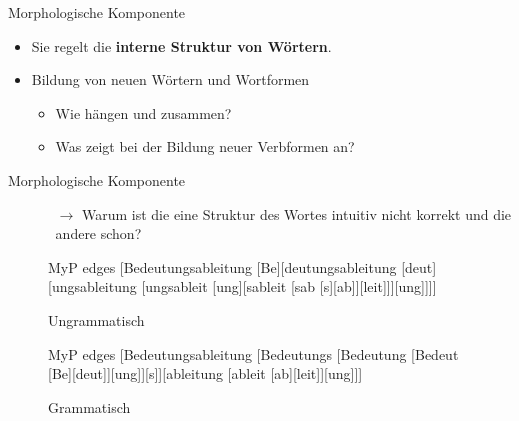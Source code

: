 \begin{frame}{Morphologische Komponente}

\begin{itemize}
	\item Sie regelt die \textbf{interne Struktur von Wörtern}.
	\item[]
	\item Bildung von neuen Wörtern und Wortformen
				
	\begin{itemize}
		\item[]
		\item<2->[$\rightarrow$] Wie hängen  und  zusammen?
		\item[]
		\item<3->[$\rightarrow$] Was zeigt  bei der Bildung neuer Verbformen an?
	\end{itemize}
			
\end{itemize}

\end{frame}



\begin{frame}{Morphologische Komponente}

\begin{itemize}
	\item[]
			
	\begin{itemize}
		\item[]
		\item[$\rightarrow$] Warum ist die eine Struktur des Wortes  intuitiv nicht korrekt und die andere schon?
	\end{itemize}
			
\end{itemize}

	
\begin{figure}[b]
	
	\begin{minipage}[b]{0.37\textwidth}
					\tiny{
		\begin{forest}MyP edges
		[Bedeutungsableitung [Be][deutungsableitung [deut][ungsableitung [ungsableit [ung][sableit [sab [s][ab]][leit]]][ung]]]]
		\end{forest}}
		
	\caption{Ungrammatisch}
	\end{minipage}
	\begin{minipage}[b]{0.20\textwidth}
	\end{minipage}
	\begin{minipage}[b]{0.37\textwidth}
	\tiny{
		\begin{forest}MyP edges
		[Bedeutungsableitung [Bedeutungs [Bedeutung [Bedeut [Be][deut]][ung]][s]][ableitung [ableit [ab][leit]][ung]]]
		\end{forest}}
			
	\caption{Grammatisch}
	\end{minipage}
	                        
\end{figure}

\end{frame}


